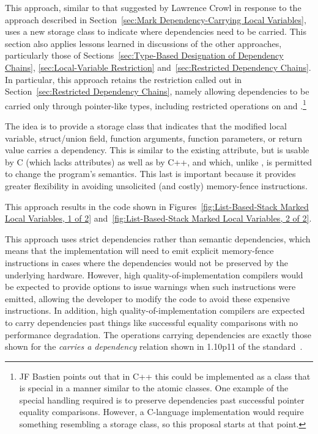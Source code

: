 \documentclass[letterpaper,twocolumn,10pt]{article}
\begin{document}
This approach, similar to that suggested by Lawrence Crowl in response to the
approach described in
Section~\ref{sec:Mark Dependency-Carrying Local Variables},
uses a new storage class to indicate where dependencies need
to be carried.
This section also applies lessons learned in discussions of the other
approaches, particularly those of
Sections~\ref{sec:Type-Based Designation of Dependency Chains},
\ref{sec:Local-Variable Restriction}
and~\ref{sec:Restricted Dependency Chains}.
In particular, this approach retains the restriction called out in
Section~\ref{sec:Restricted Dependency Chains}, namely allowing
dependencies to be carried only through pointer-like types,
including restricted operations on  and .\footnote{
	JF Bastien points out that in C++ this could be implemented
	as a class that is special in a manner similar to the atomic
	classes.
	One example of the special handling required is to preserve
	dependencies past successful pointer equality comparisons.
	However, a C-language implementation would require something
	resembling a storage class, so this proposal starts at that
	point.}

The idea is to provide a storage class 
that indicates that the modified local variable, struct/union field,
function arguments, function parameters, or return value carries a dependency.
This is similar to the existing 
attribute, but is usable by C (which lacks attributes) as well as
by C++, and which, unlike , is permitted
to change the program's semantics.
This last is important because it provides greater flexibility in
avoiding unsolicited (and costly) memory-fence instructions.

This approach results in the code shown in
Figures~\ref{fig:List-Based-Stack Marked Local Variables, 1 of 2}
and~\ref{fig:List-Based-Stack Marked Local Variables, 2 of 2}.

This approach uses strict dependencies rather than semantic dependencies,
which means that the implementation will need to emit explicit
memory-fence instructions in cases where the dependencies would
not be preserved by the underlying hardware.
However, high quality-of-implementation compilers would be expected to
provide options to issue warnings when such instructions were emitted,
allowing the developer to modify the code to avoid these expensive
instructions.
In addition, high quality-of-implementation compilers are expected
to carry dependencies past things like successful equality comparisons
with no performance degradation.
The operations carrying dependencies are exactly those shown
for the \emph{carries a dependency} relation shown in 1.10p11
of the standard~\cite{RichardSmith2015N4527}.
\end{document}
